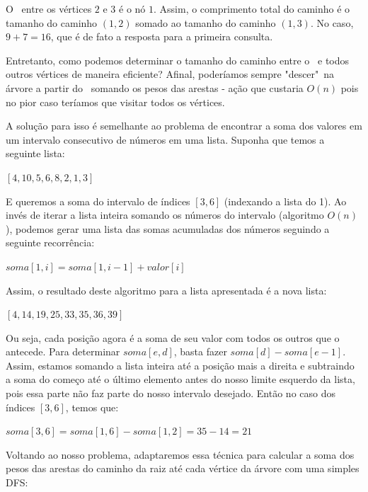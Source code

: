 O \LCA\ entre os vértices $2$ e $3$ é o nó $1$. Assim, o comprimento total do caminho é o tamanho do caminho $(1, 2)$ somado ao tamanho do caminho $(1, 3)$. No caso, $9 + 7 = 16$, que é de fato a resposta para a primeira consulta.

Entretanto, como podemos determinar o tamanho do caminho entre o \LCA\ e todos outros vértices de maneira eficiente? Afinal, poderíamos sempre "descer"\ na árvore a partir do \LCA\ somando os pesos das arestas - ação que custaria $O(n)$ pois no pior caso teríamos que visitar todos os vértices.

A solução para isso é semelhante ao problema de encontrar a soma dos valores em um intervalo consecutivo de números em uma lista. Suponha que temos a seguinte lista:

\begin{center}
    $[4, 10, 5, 6, 8, 2, 1, 3]$
\end{center}

E queremos a soma do intervalo de índices $[3, 6]$ (indexando a lista do 1). Ao invés de iterar a lista inteira somando os números do intervalo (algoritmo $O(n)$), podemos gerar uma lista das somas acumuladas dos números seguindo a seguinte recorrência:

\begin{center}
    $soma[1, i] = soma[1, i-1] + valor[i]$
\end{center}

Assim, o resultado deste algoritmo para a lista apresentada é a nova lista:

\begin{center}
    $[4, 14, 19, 25, 33, 35, 36, 39]$
\end{center}

Ou seja, cada posição agora é a soma de seu valor com todos os outros que o antecede. Para determinar $soma[e, d]$, basta fazer $soma[d] - soma[e-1]$. Assim, estamos somando a lista inteira até a posição mais a direita e subtraindo a soma do começo até o último elemento antes do nosso limite esquerdo da lista, pois essa parte não faz parte do nosso intervalo desejado. Então no caso dos índices $[3, 6]$, temos que:

\begin{center}
    $soma[3, 6] = soma[1, 6] - soma[1, 2] = 35 - 14 = 21$\\
\end{center}

Voltando ao nosso problema, adaptaremos essa técnica para calcular a soma dos pesos das arestas do caminho da raiz até cada vértice da árvore com uma simples DFS:

